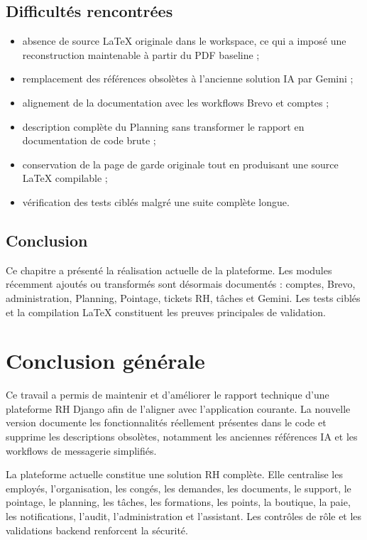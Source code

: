 \documentclass[12pt,a4paper]{report}
\begin{document}
\section{Difficultés rencontrées}
\begin{itemize}
\item absence de source LaTeX originale dans le workspace, ce qui a imposé une reconstruction maintenable à partir du PDF baseline ;
\item remplacement des références obsolètes à l'ancienne solution IA par Gemini ;
\item alignement de la documentation avec les workflows Brevo et comptes ;
\item description complète du Planning sans transformer le rapport en documentation de code brute ;
\item conservation de la page de garde originale tout en produisant une source LaTeX compilable ;
\item vérification des tests ciblés malgré une suite complète longue.
\end{itemize}


\section{Conclusion}
Ce chapitre a présenté la réalisation actuelle de la plateforme. Les modules récemment ajoutés ou transformés sont désormais documentés : comptes, Brevo, administration, Planning, Pointage, tickets RH, tâches et Gemini. Les tests ciblés et la compilation LaTeX constituent les preuves principales de validation.

\chapter*{Conclusion générale}
Ce travail a permis de maintenir et d'améliorer le rapport technique d'une plateforme RH Django afin de l'aligner avec l'application courante. La nouvelle version documente les fonctionnalités réellement présentes dans le code et supprime les descriptions obsolètes, notamment les anciennes références IA et les workflows de messagerie simplifiés.

La plateforme actuelle constitue une solution RH complète. Elle centralise les employés, l'organisation, les congés, les demandes, les documents, le support, le pointage, le planning, les tâches, les formations, les points, la boutique, la paie, les notifications, l'audit, l'administration et l'assistant. Les contrôles de rôle et les validations backend renforcent la sécurité.
\end{document}
